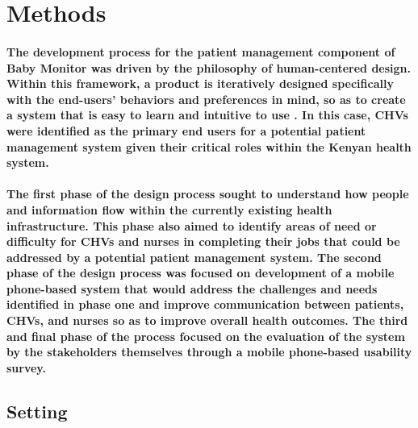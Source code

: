\section{Methods}

\paragraph{The development process for the patient management component of Baby Monitor was driven by the philosophy of human-centered design. Within this framework, a product is iteratively designed specifically with the end-users' behaviors and preferences in mind, so as to create a system that is easy to learn and intuitive to use \citep{Oviatt2006}. In this case, CHVs were identified as the primary end users for a potential patient management system given their critical roles within the Kenyan health system.}

\paragraph{The first phase of the design process sought to understand how people and information flow within the currently existing health infrastructure. This phase also aimed to identify areas of need or difficulty for CHVs and nurses in completing their jobs that could be addressed by a potential patient management system. The second phase of the design process was focused on development of a mobile phone-based system that would address the challenges and needs identified in phase one and improve communication between patients, CHVs, and nurses so as to improve overall health outcomes. The third and final phase of the process focused on the evaluation of the system by the stakeholders themselves through a mobile phone-based usability survey.}

\subsection{Setting}

